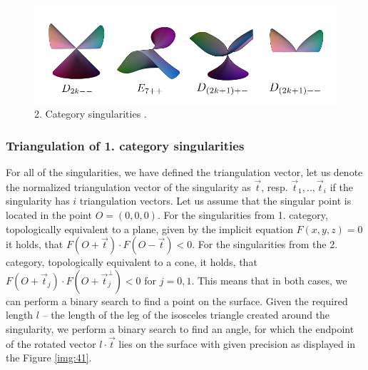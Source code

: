 \begin{enumerate}
    \begin{figure}
        \centerline{\includegraphics[scale=0.5]{images/img43}}
        \caption[2. Category singularities]
        {2. Category singularities \cite{morris2003client}.}
        \label{img:43}
    \end{figure}
\end{enumerate}

\subsubsection*{Triangulation of 1. category singularities}
For all of the singularities, we have defined the triangulation vector,
let us denote the normalized triangulation vector of the singularity 
as $\vec{t}$, resp. $\vec{t}_1, .., \vec{t}_i$ if the 
singularity has $i$ triangulation vectors.
Let us assume that the singular point is located in the point $O = (0, 0, 0).$
For the singularities from 1. category, 
topologically equivalent to a plane, given by the implicit
equation $F(x, y, z) = 0$ it holds, that $F(O+\vec{t}) \cdot F(O-\vec{t})<0$.
For the singularities from the 2. category, topologically equivalent to a cone,
it holds, that $F(O+\vec{t}_j) \cdot F(O+\vec{t}_j^\bot) <0$ for $j = 0, 1$.
This means that in both cases, we can perform a binary search to find a point on 
the surface.
Given the required length $l$ -- the length of the leg of the isosceles triangle 
created around the singularity, we perform a binary search to find
an angle, for which the endpoint of the rotated vector $l \cdot \vec{t}$ lies on 
the surface with given precision as displayed in the Figure \ref{img:41}.

